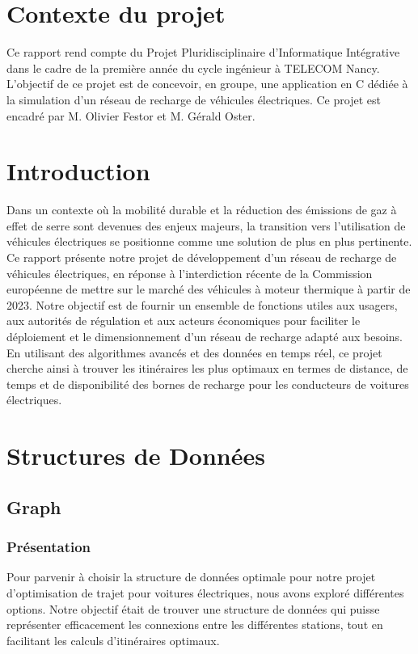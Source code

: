 \documentclass[french,a4paper]{article}
\begin{document}
\section{Contexte du projet}
Ce rapport rend compte du Projet Pluridisciplinaire d’Informatique Intégrative dans le cadre de la première année du cycle ingénieur à TELECOM Nancy.
L’objectif de ce projet est de concevoir, en groupe,  une application en C dédiée à la simulation d’un réseau de recharge de véhicules électriques. 
Ce projet est encadré par M. Olivier Festor et M. Gérald Oster.
\section{Introduction}
Dans un contexte où la mobilité durable et la réduction des émissions de gaz à effet 
de serre sont devenues des enjeux majeurs, la transition vers l'utilisation de véhicules électriques se positionne comme une solution 
de plus en plus pertinente. 
Ce rapport présente notre projet de développement d'un réseau de recharge de véhicules électriques, en réponse à l'interdiction récente de la 
Commission européenne de mettre sur le marché des véhicules à moteur thermique à partir de 2023. Notre objectif est de fournir un ensemble de
 fonctions utiles aux usagers, aux autorités de régulation et aux acteurs économiques pour faciliter le déploiement et le dimensionnement d'un 
 réseau de recharge adapté aux besoins.
En utilisant des algorithmes avancés et des données en temps réel, ce projet cherche ainsi à trouver les itinéraires les plus optimaux en termes de distance, de temps et de disponibilité des 
bornes de recharge pour les conducteurs de voitures électriques. 

\section{Structures de Données}
\subsection{Graph}
\subsubsection{Présentation}
Pour parvenir à choisir la structure de données optimale pour notre projet d'optimisation de trajet pour voitures électriques, nous avons exploré 
différentes options. Notre objectif était de trouver une structure de données qui puisse représenter 
efficacement les connexions entre les différentes stations, tout en facilitant les calculs d'itinéraires optimaux.
\end{document}
